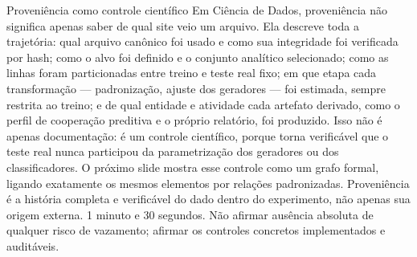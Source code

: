 \begin{frame}{Proveniência como controle científico}
  \speakernotes
    {Em Ciência de Dados, proveniência não significa apenas saber de qual site veio um arquivo. Ela descreve toda a trajetória: qual arquivo canônico foi usado e como sua integridade foi verificada por hash; como o alvo foi definido e o conjunto analítico selecionado; como as linhas foram particionadas entre treino e teste real fixo; em que etapa cada transformação --- padronização, ajuste dos geradores --- foi estimada, sempre restrita ao treino; e de qual entidade e atividade cada artefato derivado, como o perfil de cooperação preditiva e o próprio relatório, foi produzido. Isso não é apenas documentação: é um controle científico, porque torna verificável que o teste real nunca participou da parametrização dos geradores ou dos classificadores.}
    {O próximo slide mostra esse controle como um grafo formal, ligando exatamente os mesmos elementos por relações padronizadas.}
    {Proveniência é a história completa e verificável do dado dentro do experimento, não apenas sua origem externa.}
    {1 minuto e 30 segundos.}
    {Não afirmar ausência absoluta de qualquer risco de vazamento; afirmar os controles concretos implementados e auditáveis.}
\end{frame}

